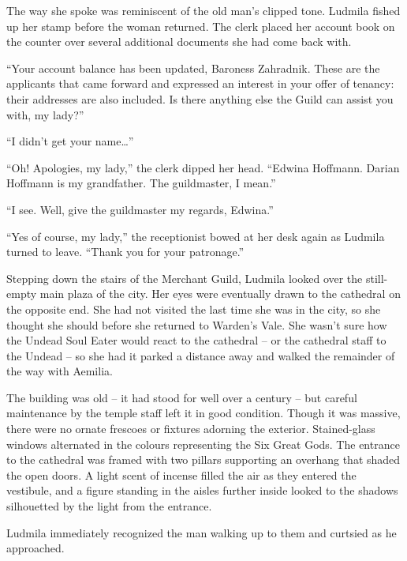 The way she spoke was reminiscent of the old man’s clipped tone. Ludmila fished up her stamp before the woman returned. The clerk placed her account book on the counter over several additional documents she had come back with.

 

“Your account balance has been updated, Baroness Zahradnik. These are the applicants that came forward and expressed an interest in your offer of tenancy: their addresses are also included. Is there anything else the Guild can assist you with, my lady?”

 

“I didn’t get your name…”

 

“Oh! Apologies, my lady,” the clerk dipped her head. “Edwina Hoffmann. Darian Hoffmann is my grandfather. The guildmaster, I mean.”

 

“I see. Well, give the guildmaster my regards, Edwina.”

 

“Yes of course, my lady,” the receptionist bowed at her desk again as Ludmila turned to leave. “Thank you for your patronage.”

 

Stepping down the stairs of the Merchant Guild, Ludmila looked over the still-empty main plaza of the city. Her eyes were eventually drawn to the cathedral on the opposite end. She had not visited the last time she was in the city, so she thought she should before she returned to Warden’s Vale. She wasn’t sure how the Undead Soul Eater would react to the cathedral – or the cathedral staff to the Undead – so she had it parked a distance away and walked the remainder of the way with Aemilia.

 

The building was old – it had stood for well over a century – but careful maintenance by the temple staff left it in good condition. Though it was massive, there were no ornate frescoes or fixtures adorning the exterior. Stained-glass windows alternated in the colours representing the Six Great Gods. The entrance to the cathedral was framed with two pillars supporting an overhang that shaded the open doors. A light scent of incense filled the air as they entered the vestibule, and a figure standing in the aisles further inside looked to the shadows silhouetted by the light from the entrance.

 

Ludmila immediately recognized the man walking up to them and curtsied as he approached.

